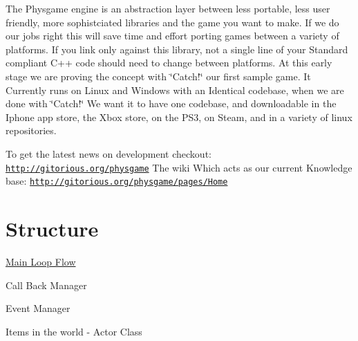 The Physgame engine is an abstraction layer between less portable, less user friendly, more sophistciated libraries and the game you want to make. If we do our jobs right this will save time and effort porting games between a variety of platforms. If you link only against this library, not a single line of your Standard compliant C++ code should need to change between platforms. At this early stage we are proving the concept with \char`\"{}Catch!\char`\"{} our first sample game. It Currently runs on Linux and Windows with an Identical codebase, when we are done with \char`\"{}Catch!\char`\"{} We want it to have one codebase, and downloadable in the Iphone app store, the Xbox store, on the PS3, on Steam, and in a variety of linux repositories.

To get the latest news on development checkout: \href{http://gitorious.org/physgame}{\tt http://gitorious.org/physgame} The wiki Which acts as our current Knowledge base: \href{http://gitorious.org/physgame/pages/Home}{\tt http://gitorious.org/physgame/pages/Home}\hypertarget{index_Engine}{}\section{Structure}\label{index_Engine}
\hyperlink{MainLoop}{Main Loop Flow}

Call Back Manager

Event Manager

Items in the world -\/ Actor Class 